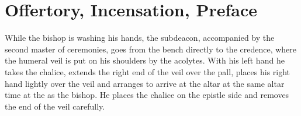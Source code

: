 \documentclass[letterpaper]{report}
\begin{document}
{\section{Offertory, Incensation, Preface}

\rubric While the bishop is washing his hands, the subdeacon, accompanied by
the second master of ceremonies, goes from the bench directly to the credence,
where the humeral veil is put on his shoulders by the acolytes. With his left
hand he takes the chalice, extends the right end of the veil over the pall,
places his right hand lightly over the veil and arranges to arrive at the altar
at the same altar time at the as the bishop. He places the chalice on the
epistle side and removes the end of the veil carefully.






}

%
\printbibliography
    
\end{document}
